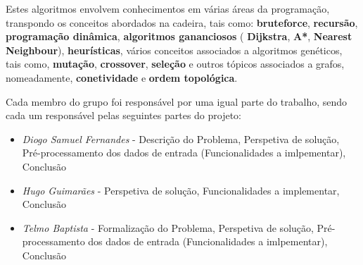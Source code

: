 \documentclass[article, a4paper, 12pt, oneside]{memoir}
\begin{document}
Estes algoritmos envolvem conhecimentos em várias áreas da programação, transpondo os conceitos abordados na cadeira, tais como: \textbf{bruteforce}, \textbf{recursão}, \textbf{programação dinâmica}, \textbf{algoritmos gananciosos} ( \textbf{Dijkstra}, \textbf{A*}, \textbf{Nearest Neighbour}), \textbf{heurísticas}, vários conceitos associados a algoritmos genéticos, tais como, \textbf{mutação}, \textbf{crossover}, \textbf{seleção} e outros tópicos associados a grafos, nomeadamente, \textbf{conetividade} e  \textbf{ordem topológica}.

Cada membro do grupo foi responsável por uma igual parte do trabalho, sendo cada um responsável pelas seguintes partes do projeto:
\begin{itemize}
	\item\emph{ Diogo Samuel Fernandes} - Descrição do Problema, Perspetiva de solução, Pré-processamento dos dados de entrada (Funcionalidades a imlpementar),  Conclusão
	\item\emph{ Hugo Guimarães} -  Perspetiva de solução, Funcionalidades a implementar, Conclusão
	\item\emph{ Telmo Baptista} - Formalização do Problema, Perspetiva de solução, Pré-processamento dos dados de entrada (Funcionalidades a imlpementar),  Conclusão
\end{itemize}

\newpage
\end{document}
